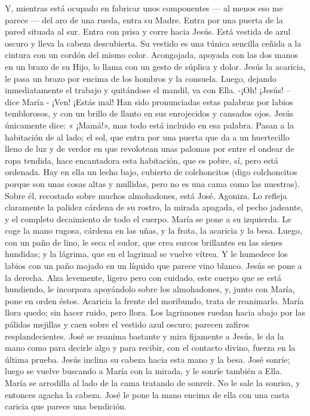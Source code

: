 \documentclass[12pt]{book} %
\begin{document}
Y, mientras está ocupado en fabricar unos componentes — al menos eso me parece — del aro de una rueda, entra su Madre. Entra por una puerta de la pared situada al sur. Entra con prisa y corre hacia Jesús. Está vestida de azul oscuro y lleva la cabeza descubierta. Su vestido es una túnica sencilla ceñida a la cintura con un cordón del mismo color. Acongojada, apoyada con las dos manos en un brazo de su Hijo, lo llama con un gesto de súplica y dolor. Jesús la acaricia, le pasa un brazo por encima de los hombros y la consuela. Luego, dejando inmediatamente el trabajo y quitándose el mandil, va con Ella. 
-¡Oh! ¡Jesús! – dice María - ¡Ven! ¡Estás mal! 
Han sido pronunciadas estas palabras por labios temblorosos, y con un brillo de llanto en sus enrojecidos y cansados 
ojos. Jesús únicamente dice: « ¡Mamá!», mas todo está incluido en esa palabra. 
Pasan a la habitación de al lado; el sol, que entra por una puerta que da a un huertecillo lleno de luz y de verdor en que revolotean unas palomas por entre el ondear de ropa tendida, hace encantadora esta habitación, que es pobre, sí, pero está ordenada. Hay en ella un lecho bajo, cubierto de colchoncitos (digo colchoncitos porque son unas cosas altas y mullidas, pero no es una cama como las nuestras). Sobre él, recostado sobre muchos almohadones, está José. Agoniza. Lo refleja claramente la palidez cárdena de su rostro, la mirada apagada, el pecho jadeante, y el completo decaimiento de todo el cuerpo. 
María se pone a su izquierda. Le coge la mano rugosa, cárdena en las uñas, y la frota, la acaricia y la besa. Luego, con un 
paño de lino, le seca el sudor, que crea surcos brillantes en las sienes hundidas; y la lágrima, que en el lagrimal se vuelve vítrea. Y le humedece los labios con un paño mojado en un líquido que parece vino blanco. 
Jesús se pone a la derecha. Alza levemente, ligero pero con cuidado, este cuerpo que se está hundiendo, le incorpora apoyándolo sobre los almohadones, y, junto con María, pone en orden éstos. Acaricia la frente del moribundo, trata de reanimarlo. 
María llora quedo; sin hacer ruido, pero llora. Los lagrimones ruedan hacia abajo por las pálidas mejillas y caen sobre el 
vestido azul oscuro; parecen zafiros resplandecientes. 
José se reanima bastante y mira fijamente a Jesús, le da la mano como para decirle algo y para recibir, con el contacto 
divino, fuerza en la última prueba. Jesús inclina su cabeza hacia esta mano y la besa. José sonríe; luego se vuelve buscando a María con la mirada, y le sonríe también a Ella. María se arrodilla al lado de la cama tratando de sonreír. No le sale la sonrisa, y entonces agacha la cabeza. José le pone la mano encima de ella con una casta caricia que parece una bendición. 
\end{document}
